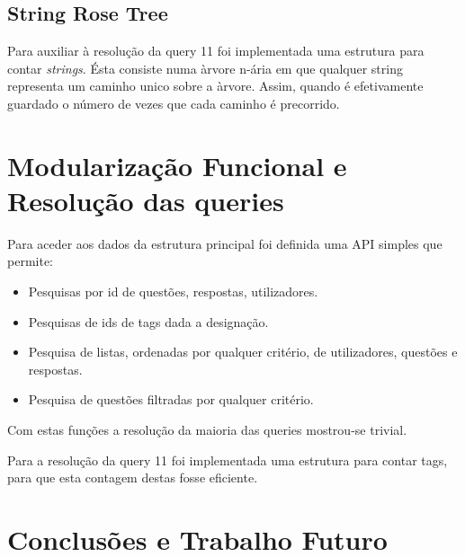 \documentclass[10pt,a4paper]{article}
\begin{document}
    \subsection{String Rose Tree}
    Para auxiliar à resolução da query 11 foi implementada uma estrutura para
    contar \textit{strings}. Ésta consiste numa àrvore n-ária em que qualquer
    string representa um caminho unico sobre a àrvore. Assim, quando é
    efetivamente guardado o número de vezes que cada caminho é precorrido.

\section{Modularização Funcional e Resolução das queries}
    Para aceder aos dados da estrutura principal foi definida uma API
    simples que permite:
    \begin{itemize}
        \item Pesquisas por id de questões, respostas, utilizadores.
        \item Pesquisas de ids de tags dada a designação.
        \item Pesquisa de listas, ordenadas por qualquer critério, de
              utilizadores, questões e respostas.
        \item Pesquisa de questões filtradas por qualquer critério.
    \end{itemize}

    Com estas funções a resolução da maioria das queries mostrou-se
    trivial.

    Para a resolução da query 11 foi implementada uma estrutura para contar tags,
    para que esta contagem destas fosse eficiente.
\section{Conclusões e Trabalho Futuro}
\end{document}
